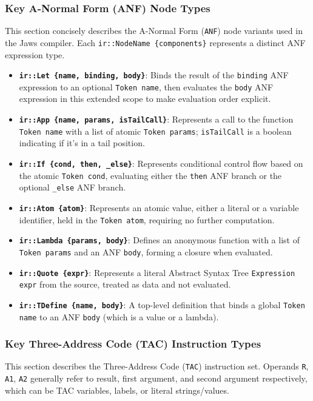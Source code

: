 \documentclass[final]{cmpreport_02}
\newcommand{\anf}{\texttt{ANF}}
\newcommand{\tac}{\texttt{TAC}}
\newcommand{\irnode}[1]{\texttt{ir::#1}}
\begin{document}
\subsubsection*{Key A-Normal Form (ANF) Node Types}
\label{tab:anf-node-types-succinct}
This section concisely describes the A-Normal Form (\anf) node variants used in the Jaws compiler. Each \texttt{ir::NodeName \{components\}} represents a distinct ANF expression type.

\begin{itemize}[itemsep=3pt]
    \item \textbf{\irnode{Let \{name, binding, body\}}}: Binds the result of the \texttt{binding} ANF expression to an optional \texttt{Token name}, then evaluates the \texttt{body} ANF expression in this extended scope to make evaluation order explicit.
    \item \textbf{\irnode{App \{name, params, isTailCall\}}}: Represents a call to the function \texttt{Token name} with a list of atomic \texttt{Token params}; \texttt{isTailCall} is a boolean indicating if it's in a tail position.
    \item \textbf{\irnode{If \{cond, then, \_else\}}}: Represents conditional control flow based on the atomic \texttt{Token cond}, evaluating either the \texttt{then} ANF branch or the optional \texttt{\_else} ANF branch.
    \item \textbf{\irnode{Atom \{atom\}}}: Represents an atomic value, either a literal or a variable identifier, held in the \texttt{Token atom}, requiring no further computation.
    \item \textbf{\irnode{Lambda \{params, body\}}}: Defines an anonymous function with a list of \texttt{Token params} and an ANF \texttt{body}, forming a closure when evaluated.
    \item \textbf{\irnode{Quote \{expr\}}}: Represents a literal Abstract Syntax Tree \texttt{Expression expr} from the source, treated as data and not evaluated.
    \item \textbf{\irnode{TDefine \{name, body\}}}: A top-level definition that binds a global \texttt{Token name} to an ANF \texttt{body} (which is a value or a lambda).
\end{itemize}

\subsubsection*{Key Three-Address Code (TAC) Instruction Types}
\label{tab:tac-instruction-types-succinct}
This section describes the Three-Address Code (\tac) instruction set. Operands \texttt{R}, \texttt{A1}, \texttt{A2} generally refer to result, first argument, and second argument respectively, which can be TAC variables, labels, or literal strings/values.
\end{document}
